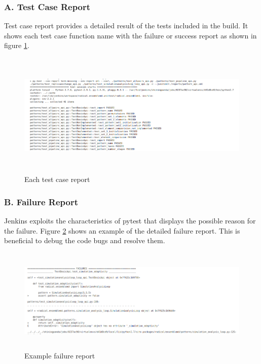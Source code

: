 \documentclass[10pt]{ruthesis}
\begin{document}
\subsubsection{\textbf{A. Test Case Report}}
Test case report provides a detailed result of the tests included in the build. It shows each test case function name with the failure or success report as shown in figure \ref{fig:test1}.

\begin{figure}
  \begin{center}
  \includegraphics[width=17cm,height=6cm]{test1.png}
  \caption{Each test case report}
  \label{fig:test1}
  \end{center}
\end{figure}


\subsubsection{\textbf{B. Failure Report}}
Jenkins exploits the characteristics of pytest that displays the possible reason for the failure. Figure \ref{fig:failure_report} shows an example of the detailed failure report. This is beneficial to debug the code bugs and resolve them.

\begin{figure}
 \begin{center}
  \includegraphics[width=15cm,height=5cm]{failure_report.png}
  \caption{Example failure report}
  \label{fig:failure_report}
  \end{center}
\end{figure}
\end{document}
